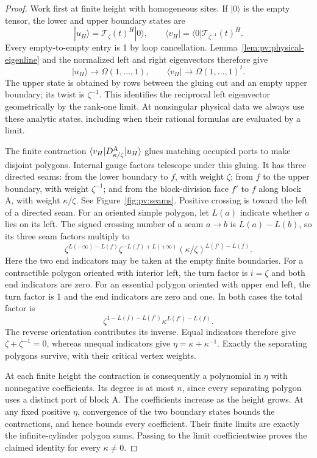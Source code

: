 \begin{proof}
Work first at finite height with homogeneous sites. If \(|0\rangle\)
is the empty tensor, the lower and upper boundary states are
\[
 |u_H\rangle=\mathcal T_\zeta(t)^H|0\rangle,
 \qquad
 \langle v_H|=\langle0|\mathcal T_{\zeta^{-1}}(t)^H.
\]
Every empty-to-empty entry is 1 by loop cancellation.
Lemma~\ref{lem:pv:physical-eigenline} and the normalized left and right
eigenvectors therefore give
\[
 |u_H\rangle\longrightarrow\Omega(1,\ldots,1),\qquad
 \langle v_H|\longrightarrow\Omega(1,\ldots,1)^t.
\]
The upper state is obtained by rows between the gluing cut and an empty
upper boundary; its twist is \(\zeta^{-1}\). This identifies the
reciprocal left eigenvector geometrically by the rank-one limit.
At nonsingular physical data we always use these analytic states,
including when their rational formulas are evaluated by a limit.

The finite contraction \(\langle v_H|D_{\kappa/\zeta}^{\rm A}|u_H\rangle\)
glues matching occupied ports to make disjoint polygons. Internal gauge
factors telescope under this gluing. It has three
directed seams: from the lower boundary to \(f\), with weight
\(\zeta\); from \(f\) to the upper boundary, with weight
\(\zeta^{-1}\); and from the block-division face \(f'\) to \(f\)
along block A, with weight \(\kappa/\zeta\). See
Figure~\ref{fig:pv:seams}. Positive crossing is toward the left of a
directed seam. For an oriented simple polygon, let \(L(a)\) indicate
whether \(a\) lies on its left. The signed crossing number of a seam
\(a\to b\) is \(L(a)-L(b)\), so its three seam factors multiply to
\[
 \zeta^{L(-\infty)-L(f)}
 \zeta^{-L(f)+L(+\infty)}
 (\kappa/\zeta)^{L(f')-L(f)}.
\]
Here the two end indicators may be taken at the empty finite boundaries.
For a contractible polygon oriented with interior left, the turn factor
is \(i=\zeta\) and both end indicators are zero. For an essential
polygon oriented with upper end left, the turn factor is 1 and the
end indicators are zero and one. In both cases the total factor is
\[
 \zeta^{1-L(f)-L(f')}\kappa^{L(f')-L(f)}.
\]
The reverse orientation contributes its inverse. Equal indicators
therefore give \(\zeta+\zeta^{-1}=0\), whereas unequal indicators
give \(\eta=\kappa+\kappa^{-1}\). Exactly the separating polygons
survive, with their critical vertex weights.

At each finite height the contraction is consequently a polynomial
in \(\eta\) with nonnegative coefficients. Its degree is at most
\(n\), since every separating polygon uses a distinct port of block A.
The coefficients increase as the height grows. At any fixed positive
\(\eta\), convergence of the two boundary states bounds the
contractions, and hence bounds every coefficient. Their finite limits
are exactly the infinite-cylinder polygon sums. Passing to the limit
coefficientwise proves the claimed identity for every \(\kappa\ne0\).

\end{proof}

